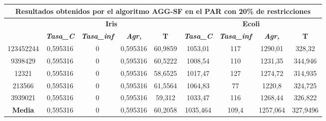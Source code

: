 \documentclass[12pt, spanish]{article}
\begin{document}
\begin{table}[H]
\footnotesize
\begin{tabular}{|c|c|c|c|c|c|c|c|c|}
\hline
\multicolumn{9}{|c|}{\textbf{Resultados obtenidos por el algoritmo AGG-SF en el PAR con 20\% de restricciones}}                                                                                                   \\ \hline
\multirow{2}{*}{} & \multicolumn{4}{c|}{\textbf{Iris}}                                                            & \multicolumn{4}{c|}{\textbf{Ecoli}}                                                           \\ \cline{2-9} 
                  & \textit{\textbf{Tasa\_C}} & \textit{\textbf{Tasa\_inf}} & \textit{\textbf{Agr,}} & \textbf{T} & \textit{\textbf{Tasa\_C}} & \textit{\textbf{Tasa\_inf}} & \textit{\textbf{Agr,}} & \textbf{T} \\ \hline
123452244         & 0,595316                  & 0                           & 0,595316               & 60,9859    & 1053,01                   & 117                         & 1290,01                & 328,32     \\ \hline
9398429           & 0,595316                  & 0                           & 0,595316               & 60,5222    & 1008,54                   & 110                         & 1231,35                & 344,946    \\ \hline
12321             & 0,595316                  & 0                           & 0,595316               & 58,6525    & 1017,47                   & 127                         & 1274,72                & 314,935    \\ \hline
213566            & 0,595316                  & 0                           & 0,595316               & 61,5564    & 1064,83                   & 77                          & 1220,8                 & 324,725    \\ \hline
3939021           & 0,595316                  & 0                           & 0,595316               & 59,312     & 1033,47                   & 116                         & 1268,44                & 326,822    \\ \hline
\textbf{Media}    & 0,595316                  & 0                           & 0,595316               & 60,2058    & 1035,464                  & 109,4                       & 1257,064               & 327,9496   \\ \hline
\end{tabular}
\end{table}
\end{document}
